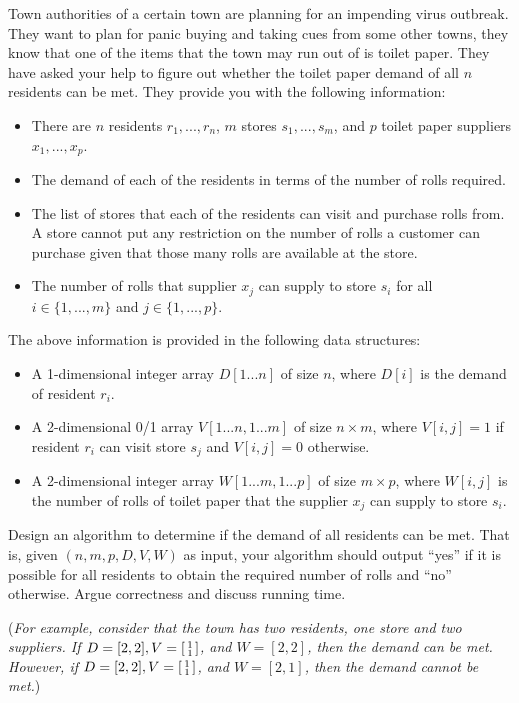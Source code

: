 \documentclass[answers]{exam}
\begin{document}
\begin{questions}
\question[25] Town authorities of a certain town are planning for an impending virus outbreak. They want to plan for panic buying and taking cues from some other towns, they know that one of the items that the town may run out of is toilet paper. They have asked your help to figure out whether the toilet paper demand of all $n$ residents can be met. They provide you with the following information:
\begin{itemize}
\item There are $n$ residents $r_1, ..., r_n$, $m$ stores $s_1, ..., s_m$, and $p$ toilet paper suppliers $x_1, ..., x_p$.
\item The demand of each of the residents in terms of the number of rolls required.
\item The list of stores that each of the residents can visit and purchase rolls from. 
A store cannot put any restriction on the number of rolls a customer can purchase given that those many rolls are available at the store.
\item The number of rolls that supplier $x_j$ can supply to store $s_i$ for all $i \in \{1, ..., m\}$ and $j \in \{1, ..., p\}$.
\end{itemize}
The above information is provided in the following data structures:
\begin{itemize}
\item A 1-dimensional integer array $D[1...n]$ of size $n$, where $D[i]$ is the demand of resident $r_i$.
\item A 2-dimensional 0/1 array $V[1...n, 1...m]$ of size $n \times m$, where $V[i, j] = 1$ if resident $r_i$ can visit store $s_j$ and $V[i, j] = 0$ otherwise.
\item A 2-dimensional integer array $W[1...m, 1...p]$ of size $m \times p$, where $W[i, j]$ is the number of rolls of toilet paper that the supplier $x_j$ can supply to store $s_i$.
\end{itemize}

Design an algorithm to determine if the demand of all residents can be met.
That is, given $(n, m, p, D, V, W)$ as input, your algorithm should output ``yes'' if it is possible for all residents to obtain the required number of rolls and ``no'' otherwise. 
Argue correctness and discuss running time.

\vspace{0.1in}

({\it For example, consider that the town has two residents, one store and two suppliers. If $D = [2, 2], V = \begin{bsmallmatrix}1 \\ 1\end{bsmallmatrix}$, and $W = [2, 2]$, then the demand can be met. However, if  $D = [2, 2], V = \begin{bsmallmatrix}1 \\ 1\end{bsmallmatrix}$, and $W = [2, 1]$, then the demand cannot be met.})


\end{questions}
\end{document}
